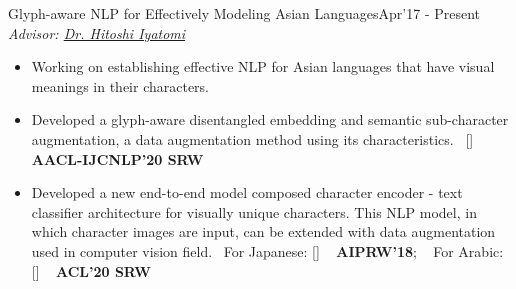 \begin{projects}
	\project
	{Glyph-aware NLP for Effectively Modeling Asian Languages}{Apr'17 - Present}
	{
		\textit{Advisor:  \href{https://iyatomi-lab.info/english/people/2013-6-8}{Dr. Hitoshi Iyatomi}}
	}
	{\begin{itemize}
			\setlength\itemsep{0.3em}
			\item Working on establishing effective NLP for Asian languages that have visual meanings in their characters.
			\item Developed a glyph-aware disentangled embedding and semantic sub-character augmentation, a data augmentation method using its characteristics.~ [\href{https://github.com/IyatomiLab/GDCE-SSA}{\small{\githubSymbol}}] ~ {\small{\lbrack\textbf{{AACL-IJCNLP'20 SRW}}\rbrack}}
			\item Developed a new end-to-end model composed character encoder - text classifier architecture for visually unique characters. This NLP model, in which character images are input, can be extended with data augmentation used in computer vision field.~ For Japanese: [\href{https://github.com/IyatomiLab/CE-CLCNN}{\small{\githubSymbol}}] ~ {\small{\lbrack\textbf{{AIPRW'18}}\rbrack}}; ~ For Arabic: [\href{https://github.com/mahmouddaif/AraDIC}{\small{\githubSymbol}}] ~ {\small{\lbrack\textbf{{ACL'20 SRW}}\rbrack}}
		\end{itemize}}

\end{projects}

